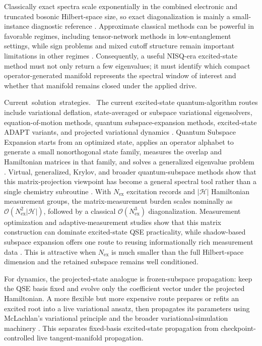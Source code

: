 \documentclass[
  reprint,
  amsmath,
  amssymb,
  aps,
  pra,
  nofootinbib,
  superscriptaddress,
  floatfix
]{revtex4-2}
\newcommand{\tentative}[1]{\textcolor{red!70!black}{#1}}
\newcommand{\structlabel}[1]{\noindent\mbox{\tentative{#1.}}~}
\newcommand{\Hcal}{\mathcal{H}}
\newcommand{\ex}{\mathrm{ex}}
\begin{document}
Classically exact spectra scale exponentially in the combined electronic and truncated bosonic Hilbert-space size, so exact diagonalization is mainly a small-instance diagnostic reference \cite{WeisseFehske2008}.  Approximate classical methods can be powerful in favorable regimes, including tensor-network methods in low-entanglement settings, while sign problems and mixed cutoff structure remain important limitations in other regimes \cite{TroyerWiese2005,Schollwoeck2011}.  Consequently, a useful NISQ-era excited-state method must not only return a few eigenvalues; it must identify which compact operator-generated manifold represents the spectral window of interest and whether that manifold remains closed under the applied drive.

\structlabel{Current solution strategies}
The current excited-state quantum-algorithm routes include variational deflation, state-averaged or subspace variational eigensolvers, equation-of-motion methods, quantum subspace-expansion methods, excited-state ADAPT variants, and projected variational dynamics \cite{Higgott2019VQD,Parrish2019MCVQE,Jones2019Spectra,Nakanishi2019SSVQE,Ollitrault2020qEOM,AsthanaKumar2023QScEOM,Yordanov2021QEB}.  Quantum Subspace Expansion starts from an optimized state, applies an operator alphabet to generate a small nonorthogonal state family, measures the overlap and Hamiltonian matrices in that family, and solves a generalized eigenvalue problem \cite{McClean2017QSE,Colless2018QSE}.  Virtual, generalized, Krylov, and broader quantum-subspace methods show that this matrix-projection viewpoint has become a general spectral tool rather than a single chemistry subroutine \cite{Urbanek2020VQSE,Yoshioka2022GQSE,CortesGray2022QKSD,Motta2024SubspaceReview}.  With $N_{\ex}$ excitation records and $|\Hcal|$ Hamiltonian measurement groups, the matrix-measurement burden scales nominally as $\mathcal O(N_{\ex}^2|\Hcal|)$, followed by a classical $\mathcal O(N_{\ex}^3)$ diagonalization.  Measurement optimization and adaptive-measurement studies show that this matrix construction can dominate excited-state QSE practicality, while shadow-based subspace expansion offers one route to reusing informationally rich measurement data \cite{ChoiIzmaylov2023MeasurementQSE,Nakamura2024AdaptiveMeasurementQSE,Boyd2025ShadowSubspace,Fischer2025ShadowQSE}.  This is attractive when $N_{\ex}$ is much smaller than the full Hilbert-space dimension and the retained subspace remains well conditioned.

For dynamics, the projected-state analogue is frozen-subspace propagation: keep the QSE basis fixed and evolve only the coefficient vector under the projected Hamiltonian.  A more flexible but more expensive route prepares or refits an excited root into a live variational ansatz, then propagates its parameters using McLachlan's variational principle and the broader variational-simulation machinery \cite{McLachlan1964,Yuan2019VQS,Barison2021PVQD,Yao2021AVQDS,Linteau2024APVQD,Zhang2025CompressedAVQD}.  This separates fixed-basis excited-state propagation from checkpoint-controlled live tangent-manifold propagation.
\end{document}
